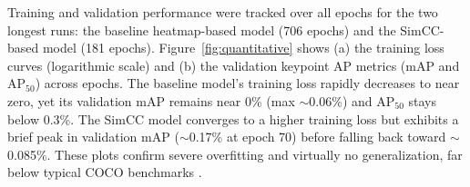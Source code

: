 Training and validation performance were tracked over all epochs for the two longest runs: the baseline heatmap-based model (706 epochs) and the SimCC-based model (181 epochs). Figure~\ref{fig:quantitative} shows (a) the training loss curves (logarithmic scale) and (b) the validation keypoint AP metrics (mAP and AP$_{50}$) across epochs. The baseline model’s training loss rapidly decreases to near zero, yet its validation mAP remains near 0\% (max $\sim$0.06\%) and AP$_{50}$ stays below 0.3\%. The SimCC model converges to a higher training loss but exhibits a brief peak in validation mAP ($\sim$0.17\% at epoch 70) before falling back toward $\sim$0.085\%. These plots confirm severe overfitting and virtually no generalization, far below typical COCO benchmarks \cite{Lin2014COCO}.

\begin{figure}[htp]
  \centering
  \captionsetup[sub]{justification=centering}  %


\end{figure}
